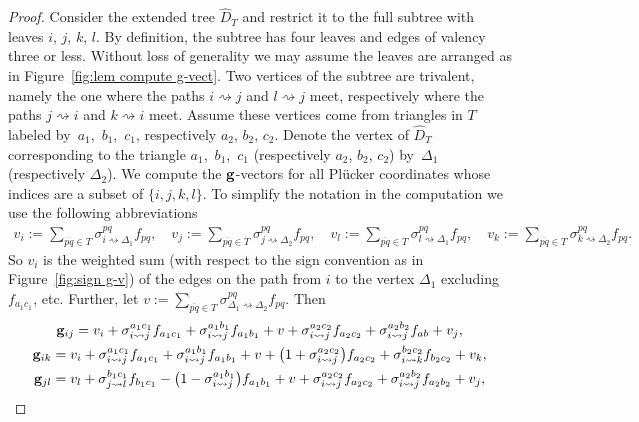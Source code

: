 \documentclass[10pt,a4paper]{amsart}
\numberwithin{equation}{section}
\begin{document}
\begin{proof}
Consider the extended tree $\widehat D_T$ and restrict it to the full subtree with leaves $i$, $j$, $k$, $l$.
By definition, the subtree has four leaves and edges of valency three or less.
Without loss of generality we may assume the leaves are arranged as in Figure~\ref{fig:lem compute g-vect}.
Two vertices of the subtree are trivalent, namely the one where the paths $i\rightsquigarrow j$ and $l\rightsquigarrow j$ meet, respectively where the paths $j\rightsquigarrow i$ and $k\rightsquigarrow i$ meet.
Assume these vertices come from triangles in $T$ labeled by~$a_1$,~$b_1$,~$c_1$, respectively $a_2$, $b_2$, $c_2$.
Denote the vertex of $\widehat{D}_T$ corresponding to the triangle $a_1$,~$b_1$,~$c_1$ (respectively $a_2$, $b_2$, $c_2$) by~$\Delta_1$ (respectively $\Delta_2$).
We compute the ${\bf g}$-vectors for all Pl\"ucker coordinates whose indices are a subset of $\{i,j,k,l\}$.
To simplify the notation in the computation we use the following abbreviations
\begin{gather*}
v_i:= \sum_{\overline{pq}\in T} \sigma_{i\rightsquigarrow \Delta_1}^{pq}f_{pq}, \quad
v_j:= \sum_{\overline{pq}\in T} \sigma_{j\rightsquigarrow \Delta_2}^{pq}f_{pq}, \quad
v_l:= \sum_{\overline{pq}\in T} \sigma_{l\rightsquigarrow \Delta_1}^{pq}f_{pq}, \quad
v_k:= \sum_{\overline{pq}\in T} \sigma_{k\rightsquigarrow \Delta_2}^{pq}f_{pq}.
\end{gather*}
So $v_i$ is the weighted sum (with respect to the sign convention as in Figure~\ref{fig:sign g-v}) of the edges on the path from $i$ to the vertex $\Delta_1$ excluding $f_{a_1c_1}$, etc. Further, let $v:= \sum_{\overline{pq}\in T} \sigma_{\Delta_1\rightsquigarrow \Delta_2}^{pq}f_{pq}$. Then
\begin{gather*}
{\bf g}_{ij} = v_i +\sigma_{i\rightsquigarrow j}^{a_1c_1} f_{a_1c_1}+\sigma_{i\rightsquigarrow j}^{a_1b_1}f_{a_1b_1}+v + \sigma_{i\rightsquigarrow j}^{a_2c_2}f_{a_2c_2} + \sigma_{i\rightsquigarrow j}^{a_2b_2} f_{ab}+v_j,
\\
{\bf g}_{ik} = v_i + \sigma_{i\rightsquigarrow j}^{a_1c_1}f_{a_1c_1} +\sigma_{i\rightsquigarrow j}^{a_1b_1}f_{a_1b_1} + v + \big(1+ \sigma_{i\rightsquigarrow j}^{a_2c_2}\big)f_{a_2c_2} + \sigma_{i\rightsquigarrow k}^{b_2c_2}f_{b_2c_2} + v_k,
\\
{\bf g}_{jl} = v_l + \sigma_{j\rightsquigarrow l}^{b_1c_1}f_{b_1c_1} - \big(1- \sigma_{i\rightsquigarrow j}^{a_1b_1}\big)f_{a_1b_1} + v + \sigma_{i\rightsquigarrow j}^{a_2c_2}f_{a_2c_2} + \sigma_{i\rightsquigarrow j}^{a_2b_2}f_{a_2b_2} + v_j,

\end{gather*}
\end{proof}
\end{document}
